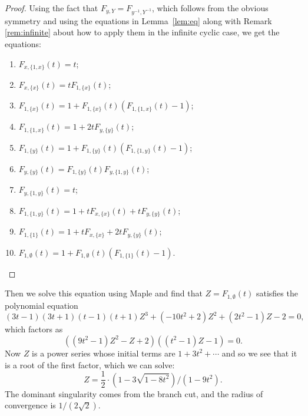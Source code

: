 \documentclass[11pt]{amsart}
\theoremstyle{definition}
\begin{document}
\begin{proof} Using the fact that $F_{y,Y}=F_{y^{-1},Y^{-1}}$, which follows from the obvious symmetry and using the equations in  Lemma~\ref{lem:eq} along with Remark \ref{rem:infinite} about how to apply them in the infinite cyclic case, we get the equations:
\begin{enumerate}
\item $F_{x,\{1,x\}}(t)=t$; 
\item $F_{x,\{x\}}(t)= t F_{1,\{x\}}(t)$;
\item $F_{1,\{x\}}(t) = 1 + F_{1,\{x\}}(t) (F_{1,\{1,x\}}(t) -1)$;
\item $F_{1,\{1,x\}}(t) = 1+ 2tF_{y,\{y\}}(t)$;
\item $F_{1,\{y\}}(t) = 1+F_{1,\{y\}}(t)(F_{1,\{1,y\}}(t)-1)$;
\item $F_{y,\{y\}}(t)=F_{1,\{y\}}(t) F_{y,\{1,y\}}(t)$;
\item $F_{y,\{1,y\}}(t)  = t$;
\item $F_{1,\{1,y\}}(t) = 1 + tF_{x,\{x\}}(t) + t F_{y, \{y\}}(t)$;
\item $F_{1,\{1\}}(t)=1+tF_{x,\{x\}}+2tF_{y,\{y\}}(t)$;
\item $F_{1,\emptyset}(t)=1 + F_{1,\emptyset}(t)(F_{1,\{1\}}(t)-1)$.
\end{enumerate}
  \end{proof}
Then we solve this equation using Maple and find that $Z=F_{1,\emptyset}(t)$ satisfies the polynomial equation
$$(3t-1)(3t+1)(t-1)(t+1)Z^3+(-10t^2+2)Z^2+(2t^2-1)Z-2=0,$$
which factors as
$$((9t^2-1) Z^2 -Z+2)((t^2-1)Z-1)=0.$$
Now $Z$ is a power series whose initial terms are $1+3t^2+\cdots$ and so we see that it is a root of the first factor, which we can solve: \[Z=\frac{1}{2}\cdot \left(1-3\sqrt{1-8t^2}\right)/(1-9t^2).\] The dominant singularity comes from the branch cut, and the radius of convergence is $1/(2\sqrt{2})$.  
\end{document}
